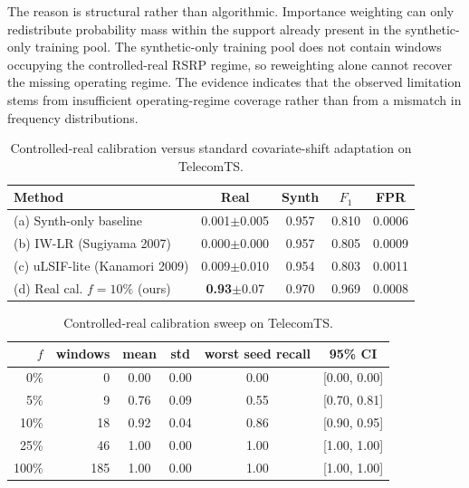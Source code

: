\documentclass[sigconf,review]{acmart}
\begin{document}
The reason is structural rather than algorithmic. Importance weighting can only redistribute probability mass within the support already present in the synthetic-only training pool. The synthetic-only training pool does not contain windows occupying the controlled-real RSRP regime, so reweighting alone cannot recover the missing operating regime. The evidence indicates that the observed limitation stems from insufficient operating-regime coverage rather than from a mismatch in frequency distributions.

\begin{table}[t]
  \caption{Controlled-real calibration versus standard covariate-shift adaptation on TelecomTS.}
  \label{tab:da_baseline}
  \footnotesize
  \setlength{\tabcolsep}{3pt}
  \begin{tabular}{@{}lcccc@{}}
    \toprule
    Method & Real & Synth & $F_1$ & FPR \\
    \midrule
    (a) Synth-only baseline           & 0.001{\tiny$\pm$0.005} & 0.957 & 0.810 & 0.0006 \\
    (b) IW-LR (Sugiyama 2007)         & 0.000{\tiny$\pm$0.000} & 0.957 & 0.805 & 0.0009 \\
    (c) uLSIF-lite (Kanamori 2009)    & 0.009{\tiny$\pm$0.010} & 0.954 & 0.803 & 0.0011 \\
    (d) Real cal. $f\!=\!10\%$ (ours) & \textbf{0.93}{\tiny$\pm$0.07} & 0.970 & 0.969 & 0.0008 \\
    \bottomrule
  \end{tabular}
\end{table}

\begin{table}[t]
  \caption{Controlled-real calibration sweep on TelecomTS.}
  \label{tab:m5_calibration_ci}
  \footnotesize
  \setlength{\tabcolsep}{2.5pt}
  \begin{tabular}{@{}rrcccc@{}}
    \toprule
    $f$ & windows & mean & std & worst seed recall & 95\% CI \\
    \midrule
    0\%  &   0 & 0.00 & 0.00 & 0.00 & [0.00, 0.00] \\
    5\%  &   9 & 0.76 & 0.09 & 0.55 & [0.70, 0.81] \\
    10\% &  18 & 0.92 & 0.04 & 0.86 & [0.90, 0.95] \\
    25\% &  46 & 1.00 & 0.00 & 1.00 & [1.00, 1.00] \\
    100\%& 185 & 1.00 & 0.00 & 1.00 & [1.00, 1.00] \\
    \bottomrule
  \end{tabular}
\end{table}
\end{document}
